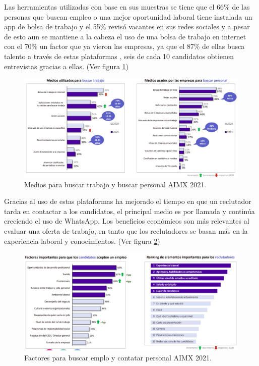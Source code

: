     Las herramientas utilizadas con base en sus muestras se tiene que el 66\% de las personas que buscan empleo o una mejor 
    oportunidad laboral tiene instalada un app de bolsa de trabajo y el 55\% revisó vacantes en sus redes sociales y a pesar de esto aun se mantiene a la cabeza el uso de una bolsa de
    trabajo en internet con el 70\% un factor que ya vieron las empresas, ya que el 87\% de ellas busca
    talento a través de estas plataformas , seis de cada 10 candidatos obtienen entrevistas gracias a ellas. (Ver figura \ref{mark:med})

    \begin{figure}[H]
        \begin{center}
            \includegraphics[width=.7\textwidth]{antecedentes/imagenes/medios.jpeg}
        \end{center}
        \caption{Medios para buscar trabajo y buscar personal AIMX 2021.}
        \label{mark:med}
    \end{figure}


    Gracias al uso de estas plataformas ha mejorado el tiempo en que un reclutador tarda en contactar a los candidatos, el principal
    medio es por llamada y continúa creciendo el uso de WhatsApp. Los beneficios económicos son más relevantes al evaluar una oferta de
    trabajo, en tanto que los reclutadores se basan más en la experiencia laboral y conocimientos. (Ver figura \ref{mark:fac})

    \begin{figure}[H]
        \begin{center}
            \includegraphics[width=.7\textwidth]{antecedentes/imagenes/consideraciones.jpeg}
        \end{center}
        \caption{Factores para buscar emplo y contatar personal AIMX 2021.}
        \label{mark:fac}
    \end{figure}


